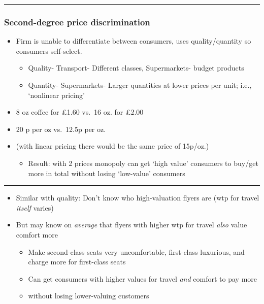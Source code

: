 \documentclass[]{article}
\providecommand{\tightlist}{%
  \setlength{\itemsep}{0pt}\setlength{\parskip}{0pt}}
\begin{document}
\begin{center}\rule{0.5\linewidth}{\linethickness}\end{center}

\hypertarget{second-degree-price-discrimination}{%
\subsubsection{Second-degree price
discrimination}\label{second-degree-price-discrimination}}

\begin{itemize}
\tightlist
\item
  Firm is unable to differentiate between consumers, uses
  quality/quantity so consumers self-select.

  \begin{itemize}
  \tightlist
  \item
    Quality- Transport- Different classes, Supermarkets- budget products
  \item
    Quantity- Supermarkets- Larger quantities at lower prices per unit;
    i.e., `nonlinear pricing'
  \end{itemize}
\end{itemize}

\begin{itemize}
\tightlist
\item
  8 oz coffee for \pounds1.60 vs.~16 oz. for \pounds2.00
\item
  20 p per oz vs.~12.5p per oz.
\item
  (with linear pricing there would be the same price of 15p/oz.)

  \begin{itemize}
  \tightlist
  \item
    Result: with 2 prices monopoly can get `high value' consumers to
    buy/get more in total without losing `low-value' consumers
  \end{itemize}
\end{itemize}

\begin{center}\rule{0.5\linewidth}{\linethickness}\end{center}

\begin{itemize}
\tightlist
\item
  Similar with quality: Don't know who high-valuation flyers are (wtp
  for travel \emph{itself} varies)
\item
  But may know on \emph{average} that flyers with higher wtp for travel
  \emph{also} value comfort more

  \begin{itemize}
  \tightlist
  \item
    Make second-class seats very uncomfortable, first-class luxurious,
    and charge more for first-class seats
  \item
    Can get consumers with higher values for travel \emph{and} comfort
    to pay more
  \item
    without losing lower-valuing customers
  \end{itemize}
\end{itemize}
\end{document}
